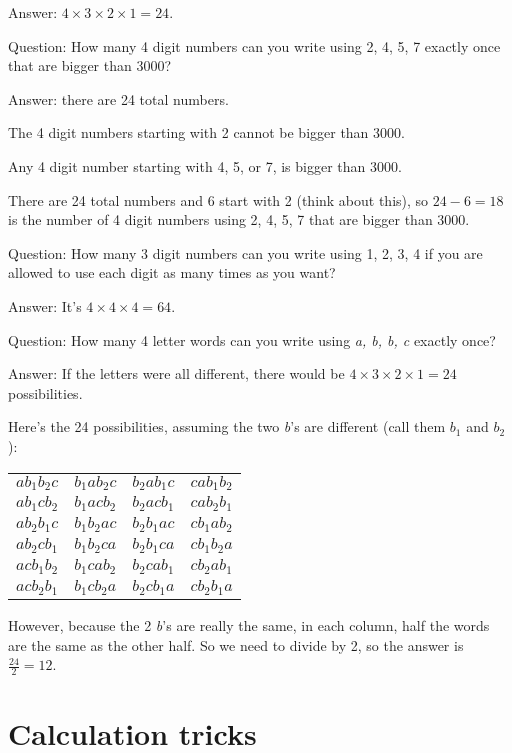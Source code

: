 \documentclass[fullpage,twocolumn]{article}
\newcommand{\vp}{{\vspace{0.1in}}}
\begin{document}
\vp
Answer: $4 \times 3 \times 2 \times 1 = 24$.

Question: How many 4 digit numbers can you write using 2, 4, 5, 7 exactly once that are bigger than 3000?

\vp
Answer: there are 24 total numbers. 

The 4 digit numbers starting with 2 cannot be bigger than 3000.

Any 4 digit number starting with 4, 5, or 7, is bigger than 3000.

There are 24 total numbers and 6 start with 2 (think about this), so $24-6=18$ is
the number of 4 digit numbers using 2, 4, 5, 7 that are bigger than 3000.

Question: How many 3 digit numbers can you write using 1, 2, 3, 4 if you are
allowed to use each digit as many times as you want?

\vp
Answer: It's $4 \times 4 \times 4 = 64$.

Question: How many 4 letter words can you write using {\em a, b, b, c} exactly once?

\vp
Answer: If the letters were all different, there would be $4 \times 3 \times 2
\times 1 = 24$ possibilities. 

Here's the 24 possibilities, assuming the two {\em b}'s are different (call
them $b_1$ and $b_2$):

\begin{tabular}{llll}
$a b_1 b_2 c $  & $ b_1 a b_2 c $ & $b_2 a b_1 c  $ & $c a b_1 b_2 $  \\
$a b_1 c b_2 $  & $ b_1 a c b_2 $ & $b_2 a c b_1  $ & $c a b_2 b_1 $  \\
$a b_2 b_1 c $  & $ b_1 b_2 a c $ & $b_2 b_1 a c  $ & $c b_1 a b_2 $  \\
$a b_2 c b_1 $  & $ b_1 b_2 c a $ & $b_2 b_1 c a  $ & $c b_1 b_2 a $  \\
$a c b_1 b_2 $  & $ b_1 c a b_2 $ & $b_2 c a b_1  $ & $c b_2 a b_1 $  \\
$a c b_2 b_1 $  & $ b_1 c b_2 a $ & $b_2 c b_1 a  $ & $c b_2 b_1 a $  \\
\end{tabular}

However, because the 2 {\em b}'s are really the same, in each
column, half the words are the same as the other half. So we need 
to divide by 2, so the answer is $\frac{24}{2} = 12$.

\section{Calculation tricks}
\end{document}
